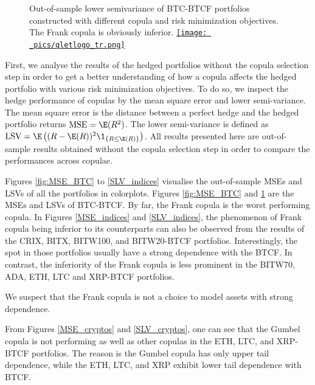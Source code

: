 \documentclass[11pt,a4paper,english]{article}
\begin{document}
\begin{figure}[t]
\begin{minipage}[t]{.475\textwidth}
      \caption{Out-of-sample lower semivariance of BTC-BTCF portfolios constructed with different copula and risk minimization objectives.
      The Frank copula is obviously inferior.
      \href{https://github.com/QuantLet/Hedging-Cryptos-with-Bitcoin-Futures/blob/main/newToQuantlet/Pynotebooks/figures/figure 6_7_8_9_10_11.ipynb}{\texttt{[image: \_pics/qletlogo\_tr.png]}} }
      \label{fig:SLV_BTC}
    \end{minipage}
    \end{figure}  

First, we analyse the results of the hedged portfolios without the
copula selection step in order to get a better understanding of how a
copula affects the hedged portfolio with various risk minimization
objectives.
To do so, we inspect the hedge performance of copulas by
the mean square error and lower semi-variance.
The mean square error
is the distance between a perfect hedge and the hedged portfolio
returns $\operatorname{MSE}= \E(R^2)$.
The lower semi-variance is defined as
$\operatorname{LSV}=\E \left( (R-\E(R))^2 \1_{\{R\leq \E(R)\}} \right)$.
All results presented here are out-of-sample results obtained without
the copula selection step in order to compare the performances across
copulae.

Figures \ref{fig:MSE_BTC} to \ref{SLV_indices} visualise the out-of-sample MSEs and LSVs of all the portfolios in colorplots.
Figures \ref{fig:MSE_BTC} and \ref{fig:SLV_BTC} are the MSEs and LSVs of BTC-BTCF. 
By far, the Frank copula is the worst performing copula.
In Figures \ref{MSE_indices} and \ref{SLV_indices}, the phenomenon
of Frank copula being inferior to its counterparts can also be observed
from the results of the CRIX, BITX, BITW100, and BITW20-BTCF
portfolios.
Interestingly, the spot in those portfolios usually have a strong
dependence with the BTCF.
In contrast, the inferiority of the Frank copula is less prominent in
the BITW70, ADA, ETH, LTC and XRP-BTCF portfolios.

We suspect that the Frank copula is not a choice to model assets with
strong dependence.

From Figures \ref{MSE_cryptos} and
\ref{SLV_cryptos}, one can see that the Gumbel copula is not performing as well as
other copulas in the ETH, LTC, and XRP-BTCF portfolios.
The reason is the Gumbel copula has only upper tail dependence,
while the ETH, LTC, and XRP exhibit lower tail dependence with BTCF.
\end{document}
